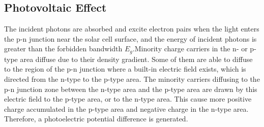 \documentclass[12pt]{article}
\begin{document}
\subsection{Photovoltaic Effect}
The incident photons are absorbed and excite electron pairs when the light enters the p-n junction near the solar cell surface, and the energy of incident photons is greater than the forbidden bandwidth $E_g$.Minority charge carriers in the n- or
p-type area diffuse due to their density gradient. Some of them are able to diffuse to the
region of the p-n junction where a built-in electric field exists, which is directed from
the n-type to the p-type area. The minority carriers diffusing to the p-n junction zone
between the n-type area and the p-type area are drawn by this electric field to the p-type
area, or to the n-type area. This cause more positive charge accumulated in the p-type area and negative charge in the n-type area. Therefore, a photoelectric potential difference is generated.
\end{document}
